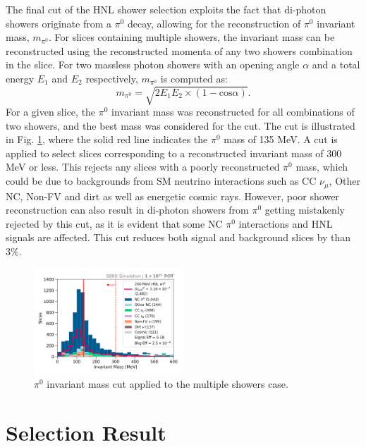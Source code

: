 The final cut of the HNL shower selection exploits the fact that di-photon showers originate from a $\pi^0$ decay, allowing for the reconstruction of $\pi^0$ invariant mass, $m_{\pi^0}$.
For slices containing multiple showers, the invariant mass can be reconstructed using the reconstructed momenta of any two showers combination in the slice.
For two massless photon showers with an opening angle $\alpha$ and a total energy $E_1$ and $E_2$ respectively, $m_{\pi^0}$ is computed as:
\begin{equation}
	m_{\pi^0} = \sqrt{2 E_1 E_2 \times (1 - \mbox{cos}\alpha)}.
\end{equation}
For a given slice, the $\pi^0$ invariant mass was reconstructed for all combinations of two showers, and the best mass was considered for the cut.
The cut is illustrated in Fig. \ref{fig:mass_cut}, where the solid red line indicates the $\pi^0$ mass of 135 MeV.
A cut is applied to select slices corresponding to a reconstructed invariant mass of 300 MeV or less.
This rejects any slices with a poorly reconstructed $\pi^0$ mass, which could be due to backgrounds from 
SM neutrino interactions such as CC $\nu_\mu$, Other NC, Non-FV and dirt as well as energetic cosmic rays.
However, poor shower reconstruction can also result in di-photon showers from $\pi^0$ getting mistakenly rejected by this cut, as it is evident that some NC $\pi^0$ interactions and HNL signals are affected.
This cut reduces both signal and background slices by than $3 \%$.

\begin{figure}[ht!]
        \centering 
        \includegraphics[width=0.495\textwidth]{pizero_mass_precut}
	\caption[Neutral Pion Invariant Mass Cut]{
	$\pi^0$ invariant mass cut applied to the multiple showers case.
	}
        \label{fig:mass_cut}
\end{figure}

\section{Selection Result}
\label{sec:select_result}

